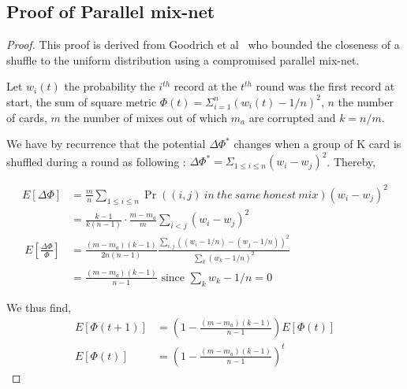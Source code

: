 \documentclass{llncs}
\begin{document}
\subsection{Proof of Parallel mix-net}\label{proof:pmn}
\begin{proof}
This proof is derived from Goodrich et al~\cite{goodrich2012privacy} who bounded the closeness of a shuffle to the uniform distribution using a compromised parallel mix-net. 

Let $w_i(t)$ the probability the $i^{th}$ record at the $t^{th}$ round was the first record at start, the sum of square metric $\Phi(t)=\Sigma_{i=1}^n (w_i(t)-1/n)^2$, $n$ the number of cards, $m$ the number of mixes out of which $m_a$ are corrupted and $k=n/m$.

We have by recurrence that the potential $\Delta\Phi^*$ changes when a group of K card is shuffled during a round as following : $\Delta\Phi^*=\Sigma_{1\leq i\leq n}(w_i-w_j)^2$.
Thereby,

\vspace{-1em}

\begin{align*}
E[\Delta\Phi] & = \frac{m}{n} \sum_{1\leq i\leq n} \Pr((i,j)\ in\ the\ same\ honest\ mix) (w_i-w_j)^2\\
&=\frac{k-1}{k(n-1)}\cdot \frac{m-m_a}{m} \sum_{i<j}(w_i-w_j)^2 \\\
E[\frac{\Delta\Phi}{\Phi}]&=\frac{(m-m_a)(k-1)}{2n(n-1)}\frac{\sum_{i,j}((w_i-1/n)-(w_j-1/n))^2}{\sum_k (w_k-1/n)^2}\\
&=\frac{(m-m_a)(k-1)}{n-1} \text{ since $\sum_k w_k -1/n=0$}
\end{align*}

We thus find,
\vspace{-1em}
\begin{align*}
E[\Phi(t+1)] &= (1-\frac{(m-m_a)(k-1)}{n-1}) E[\Phi(t)]\\
E[\Phi(t)]&= (1-\frac{(m-m_a)(k-1)}{n-1})^t
\end{align*} 


\end{proof}
\end{document}
